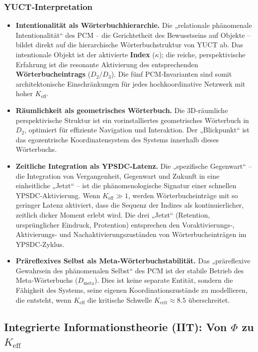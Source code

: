 \documentclass[12pt,a4paper]{article}
\begin{document}
	\subsubsection*{YUCT‑Interpretation}
	\begin{itemize}
		\item \textbf{Intentionalität als Wörterbuchhierarchie.} Die „relationale phänomenale Intentionalität“ des PCM – die Gerichtetheit des Bewusstseins auf Objekte – bildet direkt auf die hierarchische Wörterbuchstruktur von YUCT ab. Das intentionale Objekt ist der aktivierte \textbf{Index} (\(\kappa\)); die reiche, perspektivische Erfahrung ist die resonante Aktivierung des entsprechenden \textbf{Wörterbucheintrags} (\(D_2/D_3\)). Die fünf PCM‑Invarianten sind somit architektonische Einschränkungen für jedes hochkoordinative Netzwerk mit hoher \(K_{\mathrm{eff}}\).
		\item \textbf{Räumlichkeit als geometrisches Wörterbuch.} Die 3D‑räumliche perspektivische Struktur ist ein vorinstalliertes geometrisches Wörterbuch in \(D_2\), optimiert für effiziente Navigation und Interaktion. Der „Blickpunkt“ ist das egozentrische Koordinatensystem des Systems innerhalb dieses Wörterbuchs.
		\item \textbf{Zeitliche Integration als YPSDC‑Latenz.} Die „spezifische Gegenwart“ – die Integration von Vergangenheit, Gegenwart und Zukunft in eine einheitliche „Jetzt“ – ist die phänomenologische Signatur einer schnellen YPSDC‑Aktivierung. Wenn \(K_{\mathrm{eff}} \gg 1\), werden Wörterbucheinträge mit so geringer Latenz aktiviert, dass die Sequenz der Indizes als kontinuierlicher, zeitlich dicker Moment erlebt wird. Die drei „Jetzt“ (Retention, ursprünglicher Eindruck, Protention) entsprechen den Voraktivierungs‑, Aktivierungs‑ und Nachaktivierungszuständen von Wörterbucheinträgen im YPSDC‑Zyklus.
		\item \textbf{Präreflexives Selbst als Meta‑Wörterbuchstabilität.} Das „präreflexive Gewahrsein des phänomenalen Selbst“ des PCM ist der stabile Betrieb des Meta‑Wörterbuchs (\(D_{\text{meta}}\)). Dies ist keine separate Entität, sondern die Fähigkeit des Systems, seine eigenen Koordinationszustände zu modellieren, die entsteht, wenn \(K_{\mathrm{eff}}\) die kritische Schwelle \(K_{\mathrm{crit}} \approx 8.5\) überschreitet.
	\end{itemize}
	
	\subsection{Integrierte Informationstheorie (IIT): Von \(\Phi\) zu \(K_{\mathrm{eff}}\)}
	
\end{document}
